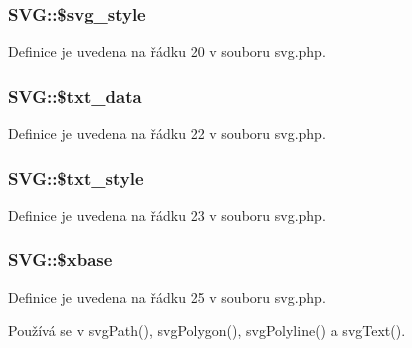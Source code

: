 \hypertarget{class_s_v_g_ac77e12c9b6b76da3203c9a493e615312}{
\subsubsection[{\$svg\-\_\-style}]{\setlength{\rightskip}{0pt plus 5cm}S\-V\-G\-::\$svg\-\_\-style}}\label{class_s_v_g_ac77e12c9b6b76da3203c9a493e615312}


Definice je uvedena na řádku 20 v souboru svg.\-php.

\hypertarget{class_s_v_g_a203118bf140223a634aa00b8d55e10e7}{
\subsubsection[{\$txt\-\_\-data}]{\setlength{\rightskip}{0pt plus 5cm}S\-V\-G\-::\$txt\-\_\-data}}\label{class_s_v_g_a203118bf140223a634aa00b8d55e10e7}


Definice je uvedena na řádku 22 v souboru svg.\-php.

\hypertarget{class_s_v_g_a2ae5fc0a696a5f74a720693bccfdf810}{
\subsubsection[{\$txt\-\_\-style}]{\setlength{\rightskip}{0pt plus 5cm}S\-V\-G\-::\$txt\-\_\-style}}\label{class_s_v_g_a2ae5fc0a696a5f74a720693bccfdf810}


Definice je uvedena na řádku 23 v souboru svg.\-php.

\hypertarget{class_s_v_g_a0aded876349f4091004a9aa222d0254f}{
\subsubsection[{\$xbase}]{\setlength{\rightskip}{0pt plus 5cm}S\-V\-G\-::\$xbase}}\label{class_s_v_g_a0aded876349f4091004a9aa222d0254f}


Definice je uvedena na řádku 25 v souboru svg.\-php.



Používá se v svg\-Path(), svg\-Polygon(), svg\-Polyline() a svg\-Text().

